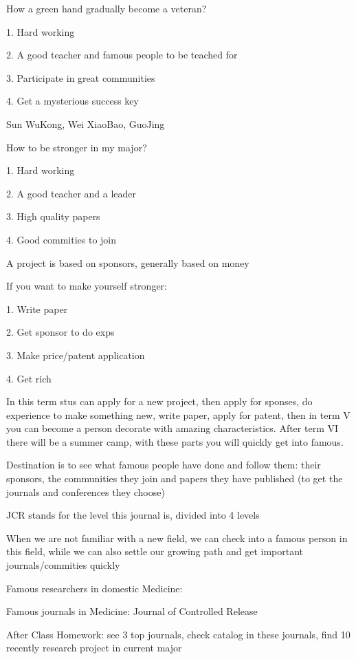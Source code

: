 \begin{notation}
    How a green hand gradually become a veteran?

    1. Hard working

    2. A good teacher and famous people to be teached for

    3. Participate in great communities
    
    4. Get a mysterious success key
    \begin{eg}
        Sun WuKong, Wei XiaoBao, GuoJing
    \end{eg}
\end{notation}
\begin{notation}
    How to be stronger in my major?

    1. Hard working

    2. A good teacher and a leader

    3. High quality papers

    4. Good commities to join
\end{notation}
\begin{notation}
    A project is based on sponsors, generally based on money
\end{notation}
\begin{notation}
    If you want to make yourself stronger:

    1. Write paper

    2. Get sponsor to do exps

    3. Make price/patent application

    4. Get rich
\end{notation}
In this term stus can apply for a new project, then apply for sponses, do experience to make something new, write paper, apply for patent, then in term V you can become a person decorate with amazing characteristics. After term VI there will be a summer camp, with these parts you will quickly get into famous.

    Destination is to see what famous people have done and follow them: their sponsors, the communities they join and papers they have published (to get the journals and conferences they choose)

    JCR stands for the level this journal is, divided into 4 levels

    When we are not familiar with a new field, we can check into a famous person in this field, while we can also settle our growing path and get important journals/commities quickly

\begin{notation}
    Famous researchers in domestic Medicine: 

    Famous journals in Medicine: Journal of Controlled Release
\end{notation}

After Class Homework: see 3 top journals, check catalog in these journals, find 10 recently research project in current major
